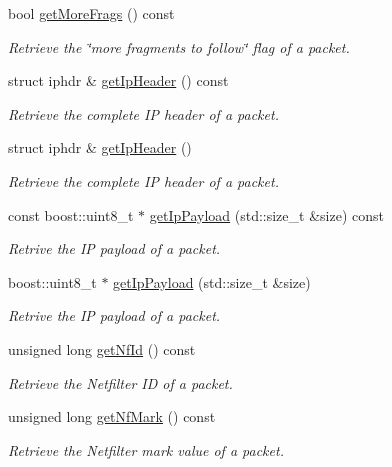 \begin{DoxyCompactItemize}
bool \hyperlink{classIPQ_1_1IpqIpPacket_a76e0d09916fc816df3dab46cb29d479f}{get\-More\-Frags} () const 
\begin{DoxyCompactList}\small\item\em \-Retrieve the \char`\"{}more fragments to follow\char`\"{} flag of a packet. \end{DoxyCompactList}\item 
struct iphdr \& \hyperlink{classIPQ_1_1IpqIpPacket_abf46954191d96b4e2fe136f79ba6c8ac}{get\-Ip\-Header} () const 
\begin{DoxyCompactList}\small\item\em \-Retrieve the complete \-I\-P header of a packet. \end{DoxyCompactList}\item 
struct iphdr \& \hyperlink{classIPQ_1_1IpqIpPacket_aa6e89b7927e748d00b9562e85192b492}{get\-Ip\-Header} ()
\begin{DoxyCompactList}\small\item\em \-Retrieve the complete \-I\-P header of a packet. \end{DoxyCompactList}\item 
const boost\-::uint8\-\_\-t $\ast$ \hyperlink{classIPQ_1_1IpqIpPacket_adc020ff0aceeba0577e4bb90dcc6f86f}{get\-Ip\-Payload} (std\-::size\-\_\-t \&size) const 
\begin{DoxyCompactList}\small\item\em \-Retrive the \-I\-P payload of a packet. \end{DoxyCompactList}\item 
boost\-::uint8\-\_\-t $\ast$ \hyperlink{classIPQ_1_1IpqIpPacket_a47343dd1a4fc52c8fda6de4aa313a688}{get\-Ip\-Payload} (std\-::size\-\_\-t \&size)
\begin{DoxyCompactList}\small\item\em \-Retrive the \-I\-P payload of a packet. \end{DoxyCompactList}\item 
unsigned long \hyperlink{classIPQ_1_1IpqPacket_ac3cbbe2b61e12730ffe231fa19c96e5a}{get\-Nf\-Id} () const 
\begin{DoxyCompactList}\small\item\em \-Retrieve the \-Netfilter \-I\-D of a packet. \end{DoxyCompactList}\item 
unsigned long \hyperlink{classIPQ_1_1IpqPacket_ab97f0a4348e53cb69ed1da74e422dc78}{get\-Nf\-Mark} () const 
\begin{DoxyCompactList}\small\item\em \-Retrieve the \-Netfilter mark value of a packet. \end{DoxyCompactList}\item 

\end{DoxyCompactItemize}
